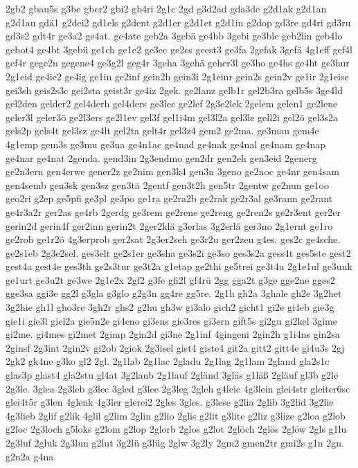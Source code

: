 {2gb2
gbau5s
g3be
gber2
gbi2
gb4ri
2g1c
2gd
g3d2ad
gda3de
g2d1ak
g2d1an
g2d1au
gdä1
g2dei2
gd1els
g2dent
g2d1er
g2d1et
g2d1in
g2dop
gd3re
gd4ri
gd3ru
gd3s2
gdt4r
ge3a2
ge4at.
ge4ate
geb2a
3gebä
ge4bb
3gebi
ge3ble
geb2lin
geb4lo
gebot4
ge4bt
3gebü
ge1ch
ge1e2
ge3ec
ge2es
geest3
ge3fa
2gefak
3gefä
4g1eff
gef4l
gef4r
gege2n
gegene4
ge3g2l
geg4r
3geha
3gehä
geher3l
ge3ho
ge4hs
ge4ht
ge3hur
2g1eid
ge4ie2
ge4ig
ge1in
ge2inf
gein2h
gein3i
2g1einr
gein2s
gein2v
ge1ir
2g1eise
gei3sh
geis2s3c
gei2sta
geist3r
ge4iz
2gek.
ge2lanz
gelb1r
gel2b3ra
gelb5s
3ge4ld
gel2den
gelder2
gel4derh
gel4ders
ge3lec
ge2lef
2g3e2lek
2gelem
gelen1
ge2lene
geler3l
geler3ö
ge2l3ers
ge2l1ev
gel3f
gel1i4m
gel3l2a
gel3le
gell2i
gel2ö
gel3s2a
gels2p
gels4t
gel3sz
ge4lt
gel2ta
gelt4r
gel3z4
gem2
ge2ma.
ge3mau
gem4e
4g1emp
gem3s
ge3mu
ge3na
ge4n1ac
ge4nad
ge4nak
ge4nal
ge4nam
ge4nap
ge4nar
ge4nat
2genda.
gend3in
2g3endmo
gen2dr
gen2eh
gen3eid
2generg
ge2n3ern
gen4erwe
gener2z
ge2nim
gen3k4
gen3n
3geno
ge2noc
ge4nr
gen4sam
gen4semb
gen3sk
gen3sz
gen3tä
2gentf
gen3t2h
gen5tr
2gentw
ge2nun
ge1oo
geo2ri
g2ep
ge5pfi
ge3pl
ge3po
ge1ra
ge2ra2b
ge2rak
ge2r3al
ge3rann
ge2rant
ge4r3a2r
ger2as
ge4rb
2gerdg
ge3rem
ge2rene
ge2reng
ge2ren2s
ge2r3ent
ger2er
gerin2d
gerin4f
ger2inn
gerin2t
2ger2klä
g3erlas
3g2erlä
ger3no
2g1ernt
ge1ro
ge2rob
ge1r2ö
4g3erprob
ger2sat
2g3er2seh
ge3r2u
ger2zeu
g4es.
ges2c
ge4sche.
ge2s1eb
2g3e2sel.
ges3elt
ge2s1er
ge3sha
ge3s2i
ge3so
ges3s2a
gess4t
ges5ste
gest2
gest4a
gest4e
ges3th
ge2s3tur
ge3t2a
g1etap
ge2thi
ge5trei
ge3t4u
2g1e1ul
ge3unk
ge1urt
ge3u2t
ge3we
2g1e2x
2gf2
g3fe
gfi2l
gf4rü
2gg
gga2t
g3ge
gge2ne
gges2
gge3sa
ggi3e
gg2l
g3gla
g3glo
g2g3n
gg4re
gg5re.
2g1h
gh2a
3ghale
gh2e
3g2het
3g2hie
gh1l
gho3re
3gh2r
ghs2
g2hu
gh3w
gi3alo
gich2
gicht1
gi2e
gi4eb
gie3g
gie1i
gie3l
giel2a
gie5n2e
gi4eno
gi3ens
gie3res
gi3ern
gift5s
gi2gu
gi2kel
3gime
gi2me.
gi4mes
gi2met
2gimp
2gin2d
gi3ne
2g1inf
4gingeni
2gin2h
g1i4ns
gin2sa
2ginsf
2g3int
2gin2v
gi2ob
2giok
2g3isel
gist4
giste4
git2a
gitt2
gitt4e
gi4u3s
2gj
2gk2
gk4ne
g3ko
gl2
2gl.
2g1lab
2g1lac
2gladu
2g1lag
2g1lam
2gland
gla2s1c
glas3p
glast4
gla2stu
gl4at
3g2laub
2g1lauf
2gländ
3gläs
g1läß
2gläuf
gl3b
g2le
2g3le.
3glea
2g3leb
g3lec
3gled
g3lee
2g3leg
2gleh
g4leic
4g3lein
glei4str
gleiter6sc
glei4t5r
g3len
4glenk
4g3ler
glerei2
2gles
3gles.
g3lese
g2lia
2glib
3g2lid
3g2lie
4g3lieb
2glif
g2lik
4glil
g2lim
2glin
g2lio
2glis
g2lit
g3lite
g2liz
g3lize
g2loa
g2lob
g2loc
2g3loch
g5loks
g2lom
g2lop
2glorb
2glos
g2lot
2glöch
2glös
2glöw
2gls
g1lu
2g3luf
2gluk
2g3lun
g2lut
3g2lü
g3lüg
2glw
3g2ly
2gm2
gmen2tr
gmi2s
g1n
2gn.
g2n2a
g4na.
}
